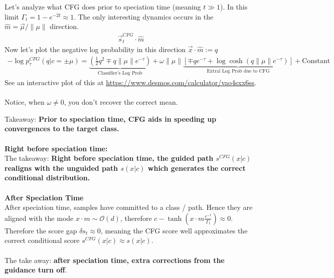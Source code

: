 \documentclass[12pt,fleqn]{article}
\numberwithin{equation}{section} %
\begin{document}
\begin{sidework}
	Let's analyze what CFG does prior to speciation time (meaning $t \gg 1$). In this limit $\Gamma_t = 1 - e^{-2t} \approx 1$.  The only interesting dynamics occurs in the $\hat m = \vec \mu / \|\mu\|$ direction.
	\begin{align}
		\vec s_t^{CFG} \cdot \hat m
	\end{align}
	Now let's plot the negative log probability in this direction $\vec x \cdot \hat m := q$
	\begin{align}
		- \log p_\tau^{CFG}(q | c = \pm \mu) = \underbrace{(\frac{1}{2}q^2 \mp q \|\mu\| e^{-\tau})}_{\text{Classifier's Log Prob}} + \omega \|\mu\| \underbrace{\left[ \mp q e^{-\tau} + \log \cosh (q \|\mu\|e^{-\tau})\right]}_{\text{Extral Log Prob due to CFG}} + \text{Constant}
	\end{align}
	See an interactive plot of this at \url{https://www.desmos.com/calculator/vao4sxx6ss}.\\
	\\
	Notice, when $\omega \neq 0$, you don't recover the correct mean. 
\end{sidework}
Takeaway: \textbf{Prior to speciation time, CFG aids in speeding up convergences to the target class.}\\
\\
\textbf{Right before speciation time:}\\
The takeaway: \textbf{Right before speciation time, the guided path $s^{CFG}(x|c)$ realigns with the unguided path $s(x|c)$ which generates the correct conditional distribution.}
\\
\\
\textbf{After Speciation Time}\\
After speciation time, samples have committed to a class / path. Hence they are aligned with the mode $x \cdot m \sim \mathcal O(d)$, therefore $c - \tanh\left(x \cdot m  \tfrac{e^{-t}}{\Gamma_t} \right) \approx 0$. Therefore the score gap $\delta s_t \approx 0$, meaning the CFG score well approximates the correct conditional score $s^{CFG}(x|c) \approx s(x|c)$.\\
\\
The take away: \textbf{after speciation time, extra corrections from the guidance turn off}.
\end{document}

